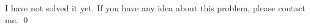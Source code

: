 \begin{pf} \rm
 I have not solved it yet. If you have any idea about this problem, please contact me. \qed
\end{pf}
